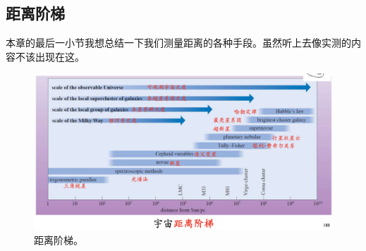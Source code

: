 \documentclass[../天体物理基础.tex]{subfiles}
\begin{document}
\subsection{距离阶梯}
本章的最后一小节我想总结一下我们测量距离的各种手段。虽然听上去像实测的内容不该出现在这。
\begin{figure}[!htbp]
\centering
\includegraphics[width=14cm]{figures/figure1_18.png}
\captionsetup{justification=raggedright, singlelinecheck=false}
\caption{距离阶梯。}
\label{距离阶梯。}
\end{figure}
\end{document}
